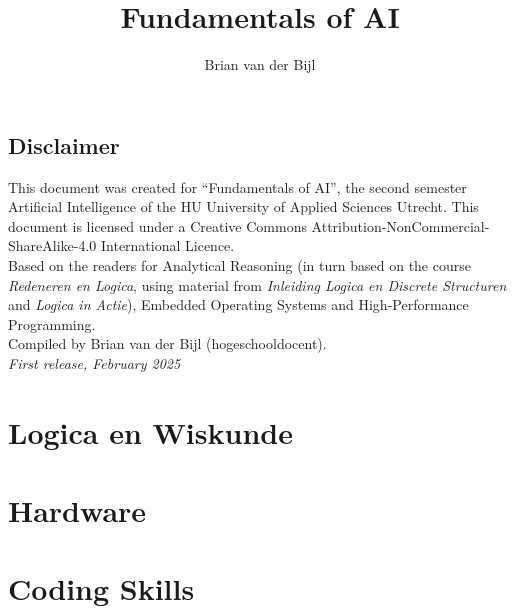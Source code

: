 \documentclass[a4paper,openany]{tufte-book-hu}
\title{Fundamentals of AI}
\author{Brian van der Bijl}
\begin{document}
\maketitle

\chapter*{Disclaimer} 
\noindent This document was created for \enquote{Fundamentals of AI}, the second semester Artificial Intelligence of the HU University of Applied Sciences Utrecht. This document is licensed under a Creative Commons Attribution-NonCommercial-ShareAlike-4.0 International Licence.\\

Based on the readers for Analytical Reasoning (in turn based on the course \emph{Redeneren en Logica}\cite{redenerenLogica}, using material from \emph{Inleiding Logica en Discrete Structuren}\cite{beschrijvenBewijzen} and \emph{Logica in Actie}\cite{benthem2009logica}), Embedded Operating Systems and High-Performance Programming.\\[3mm] %

\noindent Compiled by Brian van der Bijl (hogeschooldocent).\\[5mm] %


\noindent \textit{First release, February 2025} %

\frontmatter

\tableofcontents

\mainmatter

\part{Logica en Wiskunde}





\part{Hardware}


\part{Coding Skills}


\end{document}

